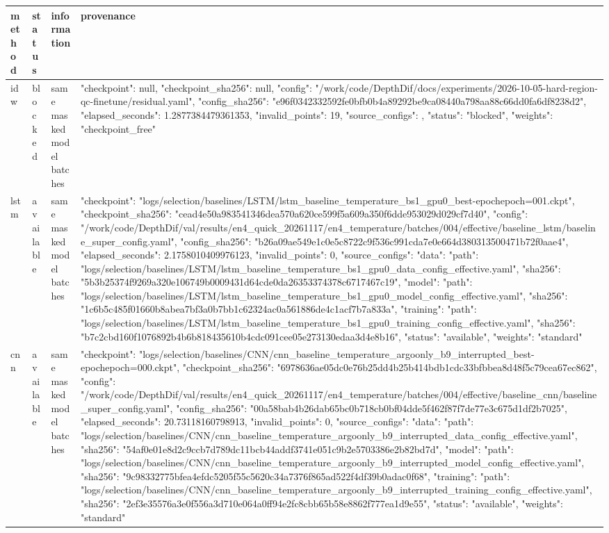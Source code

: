 \begin{tabular}{llll}
\toprule
method & status & information & provenance \\
\midrule
idw & blocked & same masked model batches & {"checkpoint": null, "checkpoint_sha256": null, "config": "/work/code/DepthDif/docs/experiments/2026-10-05-hard-region-qc-finetune/residual.yaml", "config_sha256": "e96f0342332592fe0bfb0b4a89292be9ca08440a798aa88c66dd0fa6df8238d2", "elapsed_seconds": 1.2877384479361353, "invalid_points": 19, "source_configs": {}, "status": "blocked", "weights": "checkpoint_free"} \\
lstm & available & same masked model batches & {"checkpoint": "logs/selection/baselines/LSTM/lstm_baseline_temperature_bs1_gpu0_best-epochepoch=001.ckpt", "checkpoint_sha256": "cead4e50a983541346dea570a620ce599f5a609a350f6dde953029d029cf7d40", "config": "/work/code/DepthDif/val/results/en4_quick_20261117/en4_temperature/batches/004/effective/baseline_lstm/baseline_super_config.yaml", "config_sha256": "b26a09ae549e1c0e5c8722c9f536c991cda7e0e664d380313500471b72f0aae4", "elapsed_seconds": 2.1758010409976123, "invalid_points": 0, "source_configs": {"data": {"path": "logs/selection/baselines/LSTM/lstm_baseline_temperature_bs1_gpu0_data_config_effective.yaml", "sha256": "5b3b25374f9269a320e106749b0009431d64cde0da26353374378c6717467c19"}, "model": {"path": "logs/selection/baselines/LSTM/lstm_baseline_temperature_bs1_gpu0_model_config_effective.yaml", "sha256": "1c6b5c485f01660b8abea7bf3a0b7bb1c62324ac0a561886de4c1acf7b7a833a"}, "training": {"path": "logs/selection/baselines/LSTM/lstm_baseline_temperature_bs1_gpu0_training_config_effective.yaml", "sha256": "b7c2cbd160f1076892b4b6b818435610b4cdc091cee05e273130edaa3d4e8b16"}}, "status": "available", "weights": "standard"} \\
cnn & available & same masked model batches & {"checkpoint": "logs/selection/baselines/CNN/cnn_baseline_temperature_argoonly_b9_interrupted_best-epochepoch=000.ckpt", "checkpoint_sha256": "6978636ae05dc0e76b25dd4b25b414bdb1cdc33bfbbea8d48f5c79cea67ec862", "config": "/work/code/DepthDif/val/results/en4_quick_20261117/en4_temperature/batches/004/effective/baseline_cnn/baseline_super_config.yaml", "config_sha256": "00a58bab4b26dab65bc0b718cb0bf04dde5f462f87f7de77e3c675d1df2b7025", "elapsed_seconds": 20.73118160798913, "invalid_points": 0, "source_configs": {"data": {"path": "logs/selection/baselines/CNN/cnn_baseline_temperature_argoonly_b9_interrupted_data_config_effective.yaml", "sha256": "54af0e01e8d2c9ccb7d789dc11bcb44addf3741e051c9b2e5703386e2b82bd7d"}, "model": {"path": "logs/selection/baselines/CNN/cnn_baseline_temperature_argoonly_b9_interrupted_model_config_effective.yaml", "sha256": "9c98332775bfea4efdc5205f55c5620c34a7376f865ad522f4df39b0adac0f68"}, "training": {"path": "logs/selection/baselines/CNN/cnn_baseline_temperature_argoonly_b9_interrupted_training_config_effective.yaml", "sha256": "2ef3e35576a3e0f556a3d710e064a0ff94e2fc8cbb65b58e8862f777ea1d9e55"}}, "status": "available", "weights": "standard"} \\

\end{tabular}
